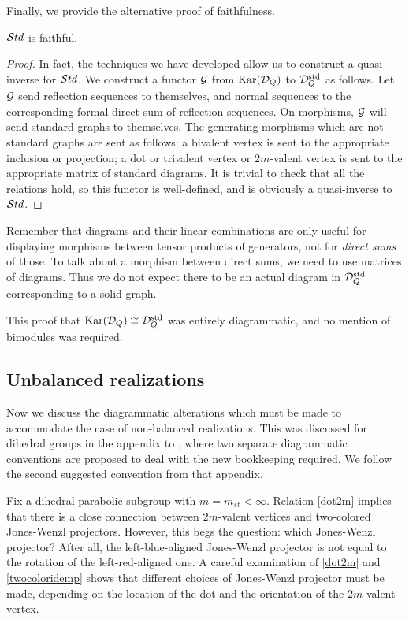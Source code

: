 Finally, we provide the alternative proof of faithfulness.

\begin{prop} $\mathcal{S}td$ is faithful. \label{stdfisfaithful2}\end{prop}

\begin{proof} In fact, the techniques we have developed allow us to construct a quasi-inverse for $\mathcal{S}td$. We construct a functor ${\mathcal{G}}$ from $\textrm{Kar}({\mathcal{D}}_Q)$ to ${\mathcal{D}}^{\textrm{std}}_Q$ as follows. Let
${\mathcal{G}}$ send reflection sequences to themselves, and normal sequences to the corresponding formal direct sum of reflection sequences. On morphisms, ${\mathcal{G}}$ will send standard graphs to
themselves. The generating morphisms which are not standard graphs are sent as follows: a bivalent vertex is sent to the appropriate inclusion or projection; a dot or trivalent vertex or
$2m$-valent vertex is sent to the appropriate matrix of standard diagrams. It is trivial to check that all the relations hold, so this functor is well-defined, and is obviously a
quasi-inverse to $\mathcal{S}td$. \end{proof}

Remember that diagrams and their linear combinations are only useful for displaying morphisms between tensor products of generators, not for \emph{direct sums} of those. To talk about a
morphism between direct sums, we need to use matrices of diagrams. Thus we do not expect there to be an actual diagram in ${\mathcal{D}}^{\textrm{std}}_Q$ corresponding to a solid graph.

This proof that $\textrm{Kar}({\mathcal{D}}_Q) \cong {\mathcal{D}}^{\textrm{std}}_Q$ was entirely diagrammatic, and no mention of bimodules was required.


\subsection{Unbalanced realizations}
\label{nonbalanced}

Now we discuss the diagrammatic alterations which must be made to accommodate the case of non-balanced realizations. This was discussed for dihedral groups in the appendix to
\cite{EDihedral}, where two separate diagrammatic conventions are proposed to deal with the new bookkeeping required. We follow the second suggested convention from that appendix.

Fix a dihedral parabolic subgroup with $m=m_{st} < \infty$. Relation \eqref{dot2m} implies that there is a close connection between $2m$-valent vertices and two-colored Jones-Wenzl
projectors. However, this begs the question: which Jones-Wenzl projector? After all, the left-blue-aligned Jones-Wenzl projector is not equal to the rotation of the left-red-aligned one. A
careful examination of \eqref{dot2m} and \eqref{twocoloridemp} shows that different choices of Jones-Wenzl projector must be made, depending on the location of the dot and the orientation
of the $2m$-valent vertex.

